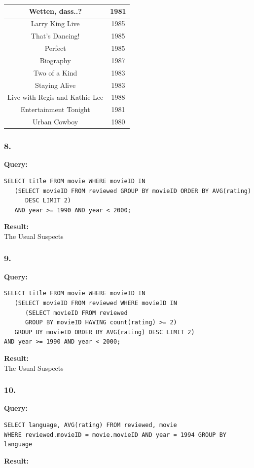 \documentclass[10pt,a4paper,final]{report}
\begin{document}
\begin{tabular}{|c|c|}
\hline Wetten, dass..? & 1981 \\ 
\hline Larry King Live & 1985 \\ 
\hline That's Dancing! & 1985 \\ 
\hline Perfect & 1985 \\ 
\hline Biography & 1987 \\ 
\hline Two of a Kind & 1983 \\ 
\hline Staying Alive & 1983 \\ 
\hline Live with Regis and Kathie Lee & 1988 \\ 
\hline Entertainment Tonight & 1981 \\ 
\hline Urban Cowboy & 1980 \\ 
\hline 
\end{tabular}

\subsubsection*{8.}
\textbf{Query:}
\begin{lstlisting}
SELECT title FROM movie WHERE movieID IN 
   (SELECT movieID FROM reviewed GROUP BY movieID ORDER BY AVG(rating) 
      DESC LIMIT 2) 
   AND year >= 1990 AND year < 2000;
\end{lstlisting}
\textbf{Result:}\\
The Usual Suspects

\subsubsection*{9.}
\textbf{Query:}
\begin{lstlisting}
SELECT title FROM movie WHERE movieID IN 
   (SELECT movieID FROM reviewed WHERE movieID IN 
      (SELECT movieID FROM reviewed 
      GROUP BY movieID HAVING count(rating) >= 2) 
   GROUP BY movieID ORDER BY AVG(rating) DESC LIMIT 2)  
AND year >= 1990 AND year < 2000;
\end{lstlisting}
\textbf{Result:}\\
The Usual Suspects

\subsubsection*{10.}
\textbf{Query:}
\begin{lstlisting}
SELECT language, AVG(rating) FROM reviewed, movie 
WHERE reviewed.movieID = movie.movieID AND year = 1994 GROUP BY language
\end{lstlisting}
\textbf{Result:}
\end{document}
